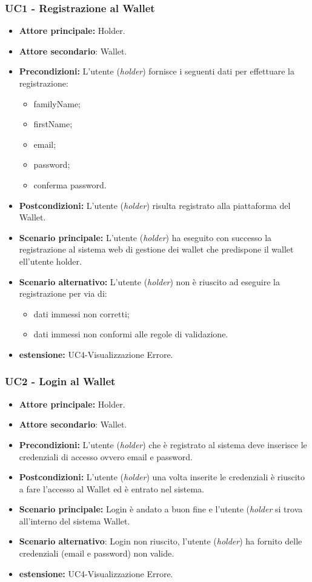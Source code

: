 \subsubsection{UC1 - Registrazione al Wallet}
\begin{itemize}
\item \textbf{Attore principale:} Holder.
\item \textbf{Attore secondario}: Wallet. 
\item \textbf{Precondizioni:} L’utente (\textit{holder}) fornisce i seguenti dati per effettuare la registrazione:
\begin{itemize}
    \item familyName;
    \item firstName;
    \item email;
    \item password;
    \item conferma password.
\end{itemize}
\item \textbf{Postcondizioni:} L’utente (\textit{holder}) risulta registrato alla piattaforma del Wallet.
\item \textbf{Scenario principale:} L'utente (\textit{holder}) ha eseguito con successo la registrazione al sistema web di gestione dei wallet che predispone il wallet ell'utente holder.
\item \textbf{Scenario alternativo:} L'utente (\textit{holder}) non è riuscito ad eseguire la registrazione per via di:
\begin{itemize}
    \item dati immessi non corretti;
    \item dati immessi non conformi alle regole di validazione.
\end{itemize}
\item \textbf{estensione:} UC4-Visualizzazione Errore.
\end{itemize}

\subsubsection{UC2 - Login al Wallet}
\begin{itemize}
\item \textbf{Attore principale:} Holder.
\item \textbf{Attore secondario}: Wallet. 
\item \textbf{Precondizioni:} L'utente (\textit{holder}) che è registrato al sistema deve inserisce le credenziali di accesso ovvero email e password.
\item \textbf{Postcondizioni:} L'utente (\textit{holder}) una volta inserite le credenziali è riuscito a fare l'accesso al Wallet ed è entrato nel sistema.
\item \textbf{Scenario principale:} Login è andato a buon fine e l'utente  (\textit{holder} si trova all'interno del sistema Wallet.
\item \textbf{Scenario alternativo}: Login non riuscito, l'utente (\textit{holder}) ha fornito delle credenziali (email e password) non valide.
\item \textbf{estensione:} UC4-Visualizzazione Errore.
\end{itemize}


